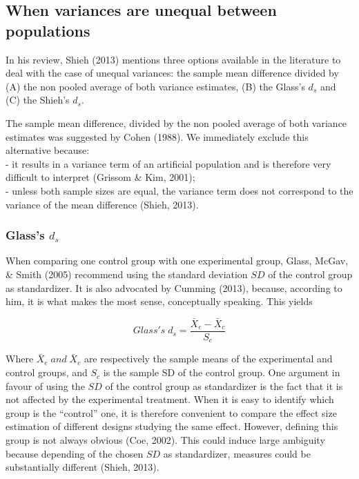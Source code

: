 \documentclass[
  man,floatsintext]{apa6}
\begin{document}
\hypertarget{when-variances-are-unequal-between-populations}{%
\subsection{When variances are unequal between populations}\label{when-variances-are-unequal-between-populations}}

In his review, Shieh (2013) mentions three options available in the literature to deal with the case of unequal variances: the sample mean difference divided by (A) the non pooled average of both variance estimates, (B) the Glass's \(d_s\) and (C) the Shieh's \(d_s\).

The sample mean difference, divided by the non pooled average of both variance estimates was suggested by Cohen (1988). We immediately exclude this alternative because:\\
- it results in a variance term of an artificial population and is therefore very difficult to interpret (Grissom \& Kim, 2001);\\
- unless both sample sizes are equal, the variance term does not correspond to the variance of the mean difference (Shieh, 2013).

\hypertarget{glasss-d_s}{%
\subsubsection{\texorpdfstring{Glass's \(d_s\)}{Glass's d\_s}}\label{glasss-d_s}}

When comparing one control group with one experimental group, Glass, McGav, \& Smith (2005) recommend using the standard deviation \(SD\) of the control group as standardizer. It is also advocated by Cumming (2013), because, according to him, it is what makes the most sense, conceptually speaking. This yields

\begin{equation} 
Glass's \; d_s = \frac{\bar{X}_{e} - \bar{X}_{c}}{S_{c}}
\label{eq:Glassds}
\end{equation}

Where \(\bar{X}_{e} \; and \; \bar{X}_{c}\) are respectively the sample means of the experimental and control groups, and \(S_{c}\) is the sample SD of the control group. One argument in favour of using the \(SD\) of the control group as standardizer is the fact that it is not affected by the experimental treatment. When it is easy to identify which group is the \enquote{control} one, it is therefore convenient to compare the effect size estimation of different designs studying the same effect. However, defining this group is not always obvious (Coe, 2002). This could induce large ambiguity because depending of the chosen \(SD\) as standardizer, measures could be substantially diﬀerent (Shieh, 2013).
\end{document}
